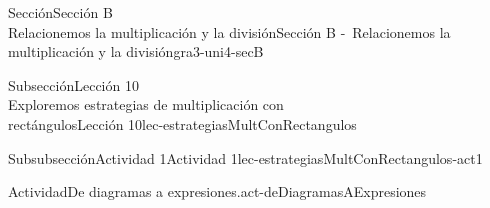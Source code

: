 \begin{sectionptx}{Sección}{{\Large Sección B\\}Relacionemos la multiplicación y la división}{}{Sección B -~Relacionemos la multiplicación y la división}{}{}{gra3-uni4-secB}
\begin{subsectionptx}{Subsección}{{\normalsize Lección 10\\[-0.05cm]}Exploremos estrategias de multiplicación con\\rectángulos}{}{Lección 10}{}{}{lec-estrategiasMultConRectangulos}
\begin{subsubsectionptx}{Subsubsección}{Actividad 1}{}{Actividad 1}{}{}{lec-estrategiasMultConRectangulos-act1}
\begin{activity}{Actividad}{De diagramas a expresiones.}{act-deDiagramasAExpresiones}

\end{activity}
\end{subsubsectionptx}
\end{subsectionptx}
\end{sectionptx}
